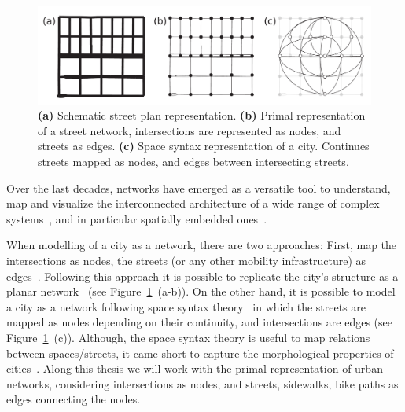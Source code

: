 \begin{figure}[th!]
	\centering
	\includegraphics[width=\textwidth]{images/introduction/networks.pdf}
	\caption[Network representation of a city]{\textbf{(a)} Schematic street plan representation. \textbf{(b)} Primal representation of a street network, intersections are represented as nodes, and streets as edges. \textbf{(c)} Space syntax representation of a city. Continues streets mapped as nodes, and edges between intersecting streets.}
	\label{fig:networks}
\end{figure}


Over the last decades, networks have emerged as a versatile tool to understand, map and visualize the interconnected architecture of a wide range of complex systems~\cite{albert2002statistical, dorogovtsev2002evolution, newman2003structure, boccaletti2006complex}, and in particular spatially embedded ones~\cite{barthelemy2011spatial}. %

When modelling of a city as a network, there are two approaches: First, map the intersections as nodes, the streets (or any other mobility infrastructure) as edges~\cite{porta2006primal}. Following this approach it is possible to replicate the city's structure as a planar network~\cite{Boeing2020Planarity} (see Figure~\ref{fig:networks}~(a-b)). On the other hand, it is possible to model a city as a network following space syntax theory~\cite{hillier1976syntax} in which the streets are mapped as nodes depending on their continuity, and intersections are edges (see Figure~\ref{fig:networks}~(c)). Although, the space syntax theory is useful to map relations between spaces/streets, it came short to capture the morphological properties of cities~\cite{batty2004new}. Along this thesis we will work with the primal representation of urban networks, considering intersections as nodes, and streets, sidewalks, bike paths as edges connecting the nodes.

